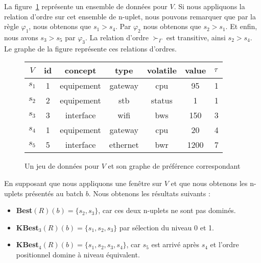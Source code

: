La figure~\ref{fig:valid:domvision:architecture:pref} représente un ensemble de données pour $V$. Si nous appliquons la relation d'ordre sur cet ensemble de n-uplet, nous pouvons remarquer que par la règle $\varphi_1$, nous obtenons que $s_1 > s_4$. Par $\varphi_2$ nous obtenons que $s_2 > s_1$. Et enfin, nous avons $s_3 > s_5$ par $\varphi_3$. La relation d'ordre $\succ_\Gamma$ est transitive, ainsi $s_2 > s_4$. Le graphe de la figure représente ces relations d'ordres.
\begin{figure}[ht]\centering
\begin{tabular}{|c|c|c|c|c|c|c|} \bottomrule
\rowcolor{hypcolor} $V$ & id & concept & type & volatile & value & $\tau$\\ \hline
$s_1$ & 1 & equipement & gateway & cpu & 95 & 1\\ \hline %
$s_2$ & 2 & equipement & stb & status & 1 & 1\\ \hline %
$s_3$ & 3 & interface & wifi & bws & 150 & 3\\ \hline %
$s_4$ & 1 & equipement & gateway & cpu & 20 & 4\\ \hline
$s_5$ & 5 & interface & ethernet & bwr & 1200 & 7\\ \toprule %
\end{tabular}\hspace{1cm}
\begin{minipage}{3cm}
\end{minipage}
\caption{Un jeu de données pour $V$ et son graphe de préférence correspondant}\label{fig:valid:domvision:architecture:pref}
\end{figure}

En supposant que nous appliquons une fenêtre sur $V$ et que nous obtenons les n-uplets présentés au batch $b$. Nous obtenons les résultats suivants : 
\begin{itemize}
	\item \textbf{Best}$(R)(b) = \{s_2,s_3\}$, car ces deux n-uplets ne sont pas dominés.
	\item \textbf{KBest}$_3(R)(b) = \{s_1,s_2,s_3\}$ par sélection du niveau 0 et 1.
	\item \textbf{KBest}$_4(R)(b) = \{s_1,s_2,s_3,s_4\}$, car $s_5$ est arrivé après $s_4$ et l'ordre positionnel domine à niveau équivalent.
\end{itemize}

